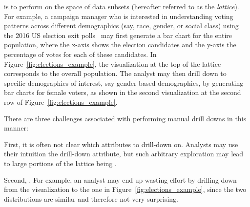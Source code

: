 is to perform 
on the space of data subsets
(hereafter referred to as the \emph{lattice}).
For example, a campaign manager
who is interested in understanding
voting patterns across different
demographics (say, race, gender, or social class)
using the 2016 US election exit polls~\cite{exitpolls}
may first generate a bar chart for the entire population,
where the x-axis shows the election candidates
and the y-axis  the percentage of votes for each of these candidates.
In Figure~\ref{fig:elections_example},
the visualization at the top of the lattice
corresponds to the overall population.
The analyst may then 
drill down to specific demographics of interest,
say gender-based demographics,
by generating bar charts for female voters,
as shown in the second visualization
at the second row of Figure~\ref{fig:elections_example}.

\par
\noindent
There are three challenges associated
with performing manual drill downs in this manner:

\smallskip
\noindent
First, it is often not clear which attributes to
drill-down on. Analysts may use their
intuition  the drill-down attribute,
but such arbitrary exploration  may lead to
large portions of the lattice being .

\smallskip
\noindent
Second, .
For example, an analyst may end up
wasting effort by drilling down
from the \blk visualization to the \blkfem one in Figure~\ref{fig:elections_example},
since the two distributions are similar and therefore not very surprising.

